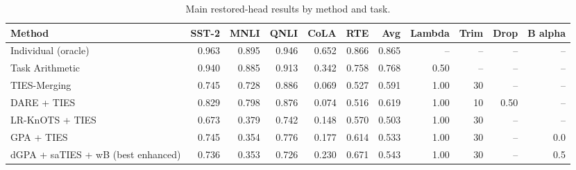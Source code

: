 \begin{table}[htbp]
\centering
\caption{Main restored-head results by method and task.}
\label{tab:main-restored-results}
\begin{tabular}{lrrrrrrrrrr}
\toprule
Method & SST-2 & MNLI & QNLI & CoLA & RTE & Avg & Lambda & Trim & Drop & B alpha \\
\midrule
Individual (oracle) & 0.963 & 0.895 & 0.946 & 0.652 & 0.866 & 0.865 & -- & -- & -- & -- \\
Task Arithmetic & 0.940 & 0.885 & 0.913 & 0.342 & 0.758 & 0.768 & 0.50 & -- & -- & -- \\
TIES-Merging & 0.745 & 0.728 & 0.886 & 0.069 & 0.527 & 0.591 & 1.00 & 30 & -- & -- \\
DARE + TIES & 0.829 & 0.798 & 0.876 & 0.074 & 0.516 & 0.619 & 1.00 & 10 & 0.50 & -- \\
LR-KnOTS + TIES & 0.673 & 0.379 & 0.742 & 0.148 & 0.570 & 0.503 & 1.00 & 30 & -- & -- \\
GPA + TIES & 0.745 & 0.354 & 0.776 & 0.177 & 0.614 & 0.533 & 1.00 & 30 & -- & 0.0 \\
dGPA + saTIES + wB (best enhanced) & 0.736 & 0.353 & 0.726 & 0.230 & 0.671 & 0.543 & 1.00 & 30 & -- & 0.5 \\
\bottomrule
\end{tabular}
\end{table}
